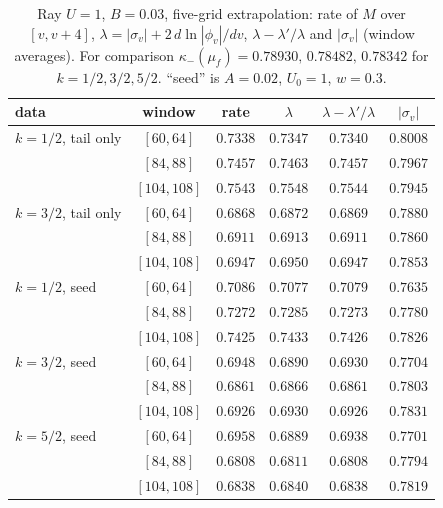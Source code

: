 \documentclass[11pt]{article}
\begin{document}
\begin{table}[h]
\centering
\caption{Ray $U=1$, $B=0.03$, five-grid extrapolation: rate of $M$ over $[v,v+4]$, $\lambda=|\sigma_v|+2\,d\ln|\phi_v|/dv$, $\lambda-\lambda'/\lambda$ and $|\sigma_v|$ (window averages). For comparison $\kappa_-(\mu_f)=0.78930,\,0.78482,\,0.78342$ for $k=1/2,3/2,5/2$. ``seed'' is $A=0.02$, $U_0=1$, $w=0.3$.}
\label{tab:ehrate}
\begin{tabular}{@{}lccccc@{}}
\toprule
data & window & rate & $\lambda$ & $\lambda-\lambda'/\lambda$ & $|\sigma_v|$\\
\midrule
$k=1/2$, tail only & $[60,64]$ & $0.7338$ & $0.7347$ & $0.7340$ & $0.8008$\\
 & $[84,88]$ & $0.7457$ & $0.7463$ & $0.7457$ & $0.7967$\\
 & $[104,108]$ & $0.7543$ & $0.7548$ & $0.7544$ & $0.7945$\\
$k=3/2$, tail only & $[60,64]$ & $0.6868$ & $0.6872$ & $0.6869$ & $0.7880$\\
 & $[84,88]$ & $0.6911$ & $0.6913$ & $0.6911$ & $0.7860$\\
 & $[104,108]$ & $0.6947$ & $0.6950$ & $0.6947$ & $0.7853$\\
$k=1/2$, seed & $[60,64]$ & $0.7086$ & $0.7077$ & $0.7079$ & $0.7635$\\
 & $[84,88]$ & $0.7272$ & $0.7285$ & $0.7273$ & $0.7780$\\
 & $[104,108]$ & $0.7425$ & $0.7433$ & $0.7426$ & $0.7826$\\
$k=3/2$, seed & $[60,64]$ & $0.6948$ & $0.6890$ & $0.6930$ & $0.7704$\\
 & $[84,88]$ & $0.6861$ & $0.6866$ & $0.6861$ & $0.7803$\\
 & $[104,108]$ & $0.6926$ & $0.6930$ & $0.6926$ & $0.7831$\\
$k=5/2$, seed & $[60,64]$ & $0.6958$ & $0.6889$ & $0.6938$ & $0.7701$\\
 & $[84,88]$ & $0.6808$ & $0.6811$ & $0.6808$ & $0.7794$\\
 & $[104,108]$ & $0.6838$ & $0.6840$ & $0.6838$ & $0.7819$\\
\bottomrule
\end{tabular}
\end{table}
\end{document}
